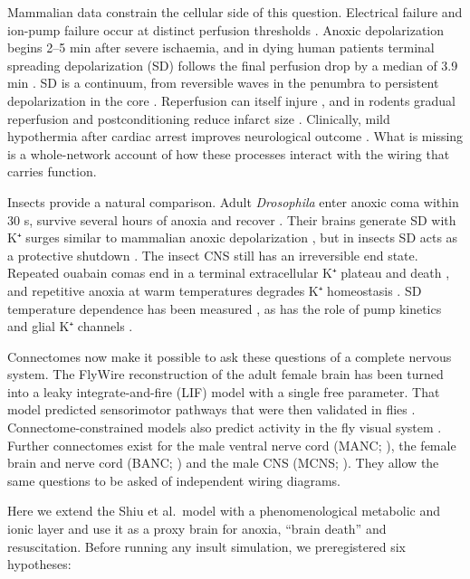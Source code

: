 \documentclass[11pt]{article}
\begin{document}
Mammalian data constrain the cellular side of this question. Electrical failure and ion-pump failure occur at distinct perfusion thresholds \cite{astrup1981,hossmann1994}. Anoxic depolarization begins 2--5 min after severe ischaemia, and in dying human patients terminal spreading depolarization (SD) follows the final perfusion drop by a median of 3.9 min \cite{dreier2018}. SD is a continuum, from reversible waves in the penumbra to persistent depolarization in the core \cite{dreier2011,dreier2015,hartings2016}. Reperfusion can itself injure \cite{eltzschig2011,choi1988}, and in rodents gradual reperfusion and postconditioning reduce infarct size \cite{gao2008,zhao2009}. Clinically, mild hypothermia after cardiac arrest improves neurological outcome \cite{haca2002,bernard2002}. What is missing is a whole-network account of how these processes interact with the wiring that carries function.

Insects provide a natural comparison. Adult \emph{Drosophila} enter anoxic coma within 30 s, survive several hours of anoxia and recover \cite{krishnan1997,campbell2018,callier2015}. Their brains generate SD with K⁺ surges similar to mammalian anoxic depolarization \cite{spong2016,armstrong2011,andersen2018}, but in insects SD acts as a protective shutdown \cite{rodgers2010,robertson2020}. The insect CNS still has an irreversible end state. Repeated ouabain comas end in a terminal extracellular K⁺ plateau and death \cite{armstrong2011}, and repetitive anoxia at warm temperatures degrades K⁺ homeostasis \cite{rodriguez2012}. SD temperature dependence has been measured \cite{andersen2025}, as has the role of pump kinetics \cite{andersen2022} and glial K⁺ channels \cite{andersen2026}.

Connectomes now make it possible to ask these questions of a complete nervous system. The FlyWire reconstruction of the adult female brain \cite{zheng2018,dorkenwald2024,schlegel2024} has been turned into a leaky integrate-and-fire (LIF) model with a single free parameter. That model predicted sensorimotor pathways that were then validated in flies \cite{shiu2024}. Connectome-constrained models also predict activity in the fly visual system \cite{lappalainen2024}. Further connectomes exist for the male ventral nerve cord (MANC; \cite{takemura2024,marin2024,cheong2026}), the female brain and nerve cord (BANC; \cite{bates2026}) and the male CNS (MCNS; \cite{berg2026}). They allow the same questions to be asked of independent wiring diagrams.

Here we extend the Shiu et al.~model with a phenomenological metabolic and ionic layer and use it as a proxy brain for anoxia, ``brain death'' and resuscitation. Before running any insult simulation, we preregistered six hypotheses:
\end{document}
